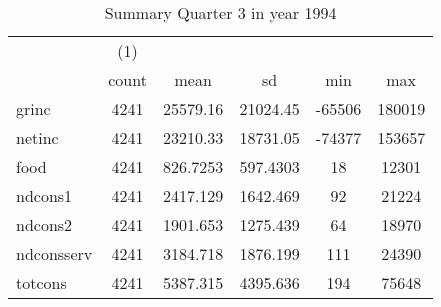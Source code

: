 \begin{table}[htbp]\centering
\def\sym#1{\ifmmode^{#1}\else\(^{#1}\)\fi}
\caption{Summary Quarter 3 in year 1994 \label{sum\_Q3\_y1994}}
\begin{tabular}{l*{1}{ccccc}}
\hline\hline
            &\multicolumn{1}{c}{(1)}&            &            &            &            \\
            &       count&        mean&          sd&         min&         max\\
\hline
grinc       &        4241&    25579.16&    21024.45&      -65506&      180019\\
netinc      &        4241&    23210.33&    18731.05&      -74377&      153657\\
food        &        4241&    826.7253&    597.4303&          18&       12301\\
ndcons1     &        4241&    2417.129&    1642.469&          92&       21224\\
ndcons2     &        4241&    1901.653&    1275.439&          64&       18970\\
ndconsserv  &        4241&    3184.718&    1876.199&         111&       24390\\
totcons     &        4241&    5387.315&    4395.636&         194&       75648\\
\hline\hline
\end{tabular}
\end{table}
